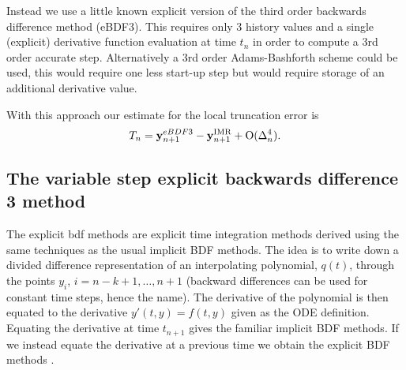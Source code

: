Instead we use a little known explicit version of the third order backwards difference method (eBDF3).
This requires only 3 history values and a single (explicit) derivative function evaluation at time $t_n$ in order to compute a 3rd order accurate step.
Alternatively a 3rd order Adams-Bashforth scheme could be used, this would require one less start-up step but would require storage of an additional derivative value.

With this approach our estimate for the local truncation error is
\begin{equation}
  \label{eq:aimr-lte-est}
  T_n = \mathbf{y}_{n+1}^{eBDF3} - \mathbf{y}_{n+1}^{\text{IMR}} + \text{O}(\Delta_{n}^4).
\end{equation}


\subsection{The variable step explicit backwards difference 3 method}


The explicit bdf methods are explicit time integration methods derived using the same techniques as the usual implicit BDF methods.
The idea is to write down a divided difference representation of an interpolating polynomial, $q(t)$, through the points $y_i$, $i=n-k+1, \ldots, n+1$ (backward differences can be used for constant time steps, hence the name).
The derivative of the polynomial is then equated to the derivative $y'(t, y) = f(t, y)$ given as the ODE definition\cite[pg. 400]{HairerNorsettWanner}.
Equating the derivative at time $t_{n+1}$ gives the familiar implicit BDF methods.
If we instead equate the derivative at a previous time we obtain the explicit BDF methods \cite[pg. 364]{HairerNorsettWanner}.

